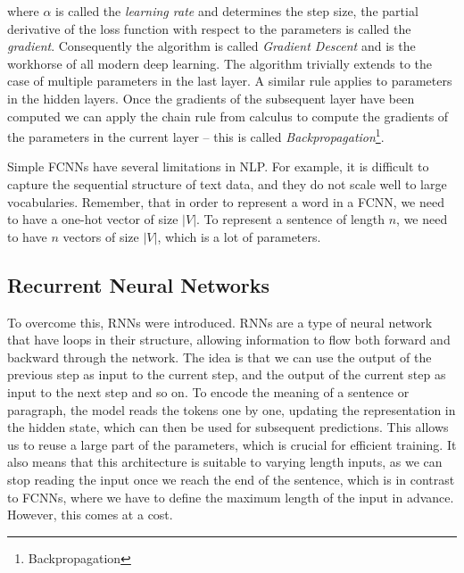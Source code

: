 where $\alpha$ is called the \textit{learning rate} and determines the step size, the partial derivative of the loss function with respect to the parameters is called the \textit{gradient}.
Consequently the algorithm is called \textit{Gradient Descent} and is the workhorse of all modern deep learning.
The algorithm trivially extends to the case of multiple parameters in the last layer.
A similar rule applies to parameters in the hidden layers.
Once the gradients of the subsequent layer have been computed we can apply the chain rule from calculus to compute the gradients of the parameters in the current layer -- this is called \textit{Backpropagation}\footnote{Backpropagation}.

Simple FCNNs have several limitations in NLP.
For example, it is difficult to capture the sequential structure of text data, and they do not scale well to large vocabularies.
Remember, that in order to represent a word in a FCNN, we need to have a one-hot vector of size $|V|$.
To represent a sentence of length $n$, we need to have $n$ vectors of size $|V|$, which is a lot of parameters.

\subsection{Recurrent Neural Networks}
To overcome this, RNNs were introduced.
RNNs are a type of neural network that have loops in their structure, allowing information to flow both forward and backward through the network.
The idea is that we can use the output of the previous step as input to the current step, and the output of the current step as input to the next step and so on.
To encode the meaning of a sentence or paragraph, the model reads the tokens one by one, updating the representation in the hidden state, which can then be used for subsequent predictions.
This allows us to reuse a large part of the parameters, which is crucial for efficient training.
It also means that this architecture is suitable to varying length inputs, as we can stop reading the input once we reach the end of the sentence, which is in contrast to FCNNs, where we have to define the maximum length of the input in advance.
However, this comes at a cost.

